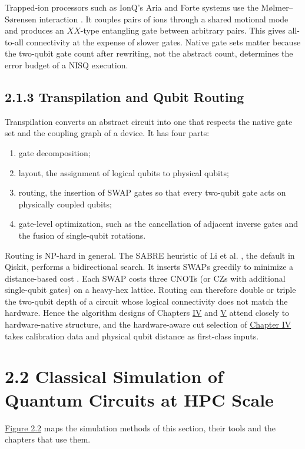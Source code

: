 \documentclass{report}
\theoremstyle{plain}
\theoremstyle{definition}
\theoremstyle{remark}
\begin{document}
Trapped-ion processors such as IonQ's Aria and Forte systems use the M{\o}lmer--S{\o}rensen interaction \cite{sorensen1999ms}. It couples pairs of ions through a shared motional mode and produces an $XX$-type entangling gate between arbitrary pairs. This gives all-to-all connectivity at the expense of slower gates. Native gate sets matter because the two-qubit gate count after rewriting, not the abstract count, determines the error budget of a NISQ execution.

\subsection{2.1.3 Transpilation and Qubit Routing}

Transpilation converts an abstract circuit into one that respects the native gate set and the coupling graph of a device. It has four parts:
\begin{enumerate}
\item gate decomposition;
\item layout, the assignment of logical qubits to physical qubits;
\item routing, the insertion of SWAP gates so that every two-qubit gate acts on physically coupled qubits;
\item gate-level optimization, such as the cancellation of adjacent inverse gates and the fusion of single-qubit rotations.
\end{enumerate}
Routing is NP-hard in general. The SABRE heuristic of Li et al. \cite{li2019sabre}, the default in Qiskit, performs a bidirectional search. It inserts SWAPs greedily to minimize a distance-based cost \cite{javadiabhari2024qiskit}. Each SWAP costs three CNOTs (or CZs with additional single-qubit gates) on a heavy-hex lattice. Routing can therefore double or triple the two-qubit depth of a circuit whose logical connectivity does not match the hardware. Hence the algorithm designs of Chapters \hyperref[ch:qml]{IV} and \hyperref[ch:nisq]{V} attend closely to hardware-native structure, and the hardware-aware cut selection of \hyperref[ch:qml]{Chapter IV} takes calibration data and physical qubit distance as first-class inputs.

\section{2.2 Classical Simulation of Quantum Circuits at HPC Scale}\label{sec:bg:sim}

\hyperref[fig:bg:simlandscape]{Figure 2.2} maps the simulation methods of this section, their tools and the chapters that use them.
\end{document}
